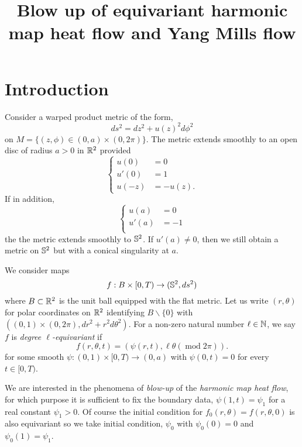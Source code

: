 \documentclass{amsart}
\begin{document}
\title[]
 {Blow up of equivariant harmonic map heat flow and Yang Mills flow}

\curraddr{}
\email{}

\dedicatory{}
\subjclass[2010]{}
\keywords{}

\begin{abstract}
\end{abstract}

\maketitle

\section{Introduction}
\label{sec:intro}

Consider a warped product metric of the form,
\[
ds^2 = dz^2 + u(z)^2 d\phi^2
\]
on $M = \{(z,\phi) \in (0, a) \times (0, 2\pi)\}$. The metric extends smoothly to an open disc of radius $a > 0$ in $\R^2$ provided
\[
\begin{cases}
u(0) &= 0 \\
u'(0) &= 1 \\
u(-z) &= - u(z).
\end{cases}
\]
If in addition,
\[
\begin{cases}
u(a) &= 0 \\
u'(a) &= -1 \\
\end{cases}
\]
the the metric extends smoothly to $\S^2$. If $u'(a) \ne 0$, then we still obtain a metric on $\S^2$ but with a conical singularity at $a$.

We consider maps
\[
f : B \times [0, T) \to (\S^2, ds^2)
\]
where $B \subset \R^2$ is the unit ball equipped with the flat metric. Let us write $(r, \theta)$ for polar coordinates on $\R^2$ identifying $B \backslash \{0\}$ with $((0, 1) \times (0, 2\pi), dr^2 + r^2 d\theta^2)$. For a non-zero natural number \(\ell \in \N\), we say $f$ is \emph{degree $\ell$-equivariant} if
\[
f (r, \theta, t) = (\psi(r, t), \ell\theta (\operatorname{mod} 2\pi)).
\]
for some smooth $\psi : (0, 1) \times [0, T) \to (0, a)$ with \(\psi(0, t) = 0\) for every \(t \in [0, T)\).

We are interested in the phenomena of \emph{blow-up} of the \emph{harmonic map heat flow}, for which purpose it is sufficient to fix the boundary data, \(\psi(1, t) = \psi_1\) for a real constant \(\psi_1 > 0\). Of course the initial condition for \(f_0(r, \theta) = f(r, \theta, 0)\) is also equivariant so we take initial condition, \(\psi_0\) with \(\psi_0(0) = 0\) and \(\psi_0(1) = \psi_1\).
\end{document}
